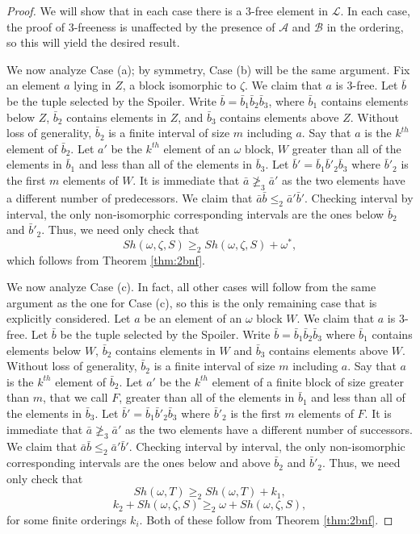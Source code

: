 \documentclass[11pt]{amsart}
\theoremstyle{definition}
\def\A{\mathcal A}
\def\B{\mathcal{B}}
\def\L{\mathcal L}
\begin{document}
\begin{proof}
    We will show that in each case there is a $3$-free element in $\L$.
    In each case, the proof of $3$-freeness is unaffected by the presence of $\A$ and $\B$ in the ordering, so this will yield the desired result.

    We now analyze Case (a); by symmetry, Case (b) will be the same argument.
    Fix an element $a$ lying in $Z$, a block isomorphic to $\zeta$.
    We claim that $a$ is $3$-free.
    Let $\bar{b}$ be the tuple selected by the Spoiler.
    Write $\bar{b}=\bar{b}_1\bar{b}_2\bar{b}_3$, where $\bar{b}_1$ contains elements below $Z$, $\bar{b}_2$ contains elements in $Z$, and $\bar{b}_3$ contains elements above $Z$.
    Without loss of generality, $\bar{b}_2$ is a finite interval of size $m$ including $a$.
    Say that $a$ is the $k^{th}$ element of $\bar{b}_2$.
    Let $a'$ be the $k^{th}$ element of an $\omega$ block, $W$ greater than all of the elements in $\bar{b}_1$ and less than all of the elements in  $\bar{b}_3$.
    Let $\bar{b}'=\bar{b}_1\bar{b}'_2\bar{b}_3$ where $\bar{b}'_2$ is the first $m$ elements of $W$.
    It is immediate that $\bar{a}\not\geq_3\bar{a}'$ as the two elements have a different number of predecessors. 
    We claim that $\bar{a}\bar{b}\leq_2\bar{a}'\bar{b}'$.
    Checking interval by interval, the only non-isomorphic corresponding intervals are the ones below $\bar{b}_2$ and $\bar{b}'_2$.
    Thus, we need only check that
    \[Sh(\omega,\zeta,S)\geq_2 Sh(\omega,\zeta,S)+\omega^*,\]
    which follows from Theorem \ref{thm:2bnf}.

    We now analyze Case (c).
    In fact, all other cases will follow from the same argument as the one for Case (c), so this is the only remaining case that is explicitly considered.
    Let $a$ be an element of an $\omega$ block $W$.
     We claim that $a$ is $3$-free.
    Let $\bar{b}$ be the tuple selected by the Spoiler.
    Write $\bar{b}=\bar{b}_1\bar{b}_2\bar{b}_3$ where $\bar{b}_1$ contains elements below $W$, $\bar{b}_2$ contains elements in $W$ and $\bar{b}_3$ contains elements above $W$.
    Without loss of generality, $\bar{b}_2$ is a finite interval of size $m$ including $a$.
    Say that $a$ is the $k^{th}$ element of $\bar{b}_2$.
    Let $a'$ be the $k^{th}$ element of a finite block of size greater than $m$, that we call $F$, greater than all of the elements in $\bar{b}_1$ and less than all of the elements in  $\bar{b}_3$.
    Let $\bar{b}'=\bar{b}_1\bar{b}'_2\bar{b}_3$ where $\bar{b}'_2$ is the first $m$ elements of $F$.
    It is immediate that $\bar{a}\not\geq_3\bar{a}'$ as the two elements have a different number of successors. 
    We claim that $\bar{a}\bar{b}\leq_2\bar{a}'\bar{b}'$.
    Checking interval by interval, the only non-isomorphic corresponding intervals are the ones below and above $\bar{b}_2$ and $\bar{b}'_2$.
    Thus, we need only check that
    \[Sh(\omega,T)\geq_2 Sh(\omega,T)+k_1,\]
    \[k_2+Sh(\omega,\zeta,S)\geq_2 \omega+Sh(\omega,\zeta,S),\]
    for some finite orderings $k_i$.
    Both of these follow from Theorem \ref{thm:2bnf}.
\end{proof}
\end{document}
